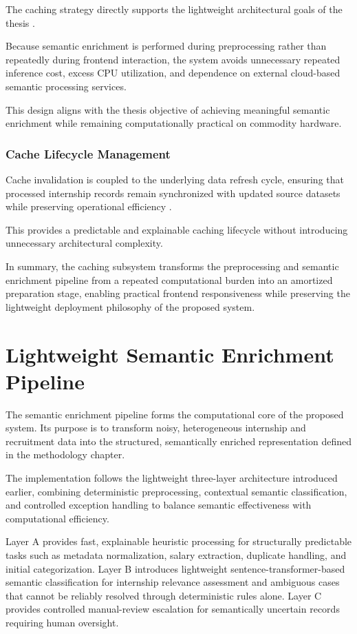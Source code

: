 The caching strategy directly supports the lightweight architectural goals of the thesis \cite{schwartz2020green, menghani2023efficient}.

Because semantic enrichment is performed during preprocessing rather than repeatedly during frontend interaction, the system avoids unnecessary repeated inference cost, excess CPU utilization, and dependence on external cloud-based semantic processing services.

This design aligns with the thesis objective of achieving meaningful semantic enrichment while remaining computationally practical on commodity hardware.

\subsubsection*{Cache Lifecycle Management}

Cache invalidation is coupled to the underlying data refresh cycle, ensuring that processed internship records remain synchronized with updated source datasets while preserving operational efficiency \cite{smith1982cache, kleppmann2017designing}.

This provides a predictable and explainable caching lifecycle without introducing unnecessary architectural complexity.

In summary, the caching subsystem transforms the preprocessing and semantic enrichment pipeline from a repeated computational burden into an amortized preparation stage, enabling practical frontend responsiveness while preserving the lightweight deployment philosophy of the proposed system.

\section{Lightweight Semantic Enrichment Pipeline}

The semantic enrichment pipeline forms the computational core of the proposed system. Its purpose is to transform noisy, heterogeneous internship and recruitment data into the structured, semantically enriched representation defined in the methodology chapter.

The implementation follows the lightweight three-layer architecture introduced earlier, combining deterministic preprocessing, contextual semantic classification, and controlled exception handling to balance semantic effectiveness with computational efficiency.

Layer A provides fast, explainable heuristic processing for structurally predictable tasks such as metadata normalization, salary extraction, duplicate handling, and initial categorization. Layer B introduces lightweight sentence-transformer-based semantic classification for internship relevance assessment and ambiguous cases that cannot be reliably resolved through deterministic rules alone. Layer C provides controlled manual-review escalation for semantically uncertain records requiring human oversight.

